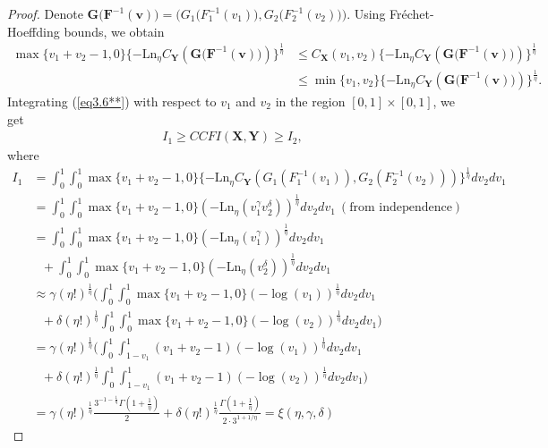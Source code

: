 \documentclass[12pt, a4paper]{article}
\numberwithin{equation}{section}
\begin{document}
\begin{proof}
Denote $\textbf{G}\big(\textbf{F}^{-1}(\textbf{v})\big)=\big(G_1\big(F_1^{-1}(v_1)\big),G_2\big(F_2^{-1}(v_2)\big)\big)$. Using Fr\'echet-Hoeffding bounds, we obtain 
\begin{align}\label{eq3.6**}
\max\{v_1+v_2-1,0\}\{-\mathrm{Ln}_\eta C_{\textbf{Y}}(\textbf{G}\big(\textbf{F}^{-1}(\textbf{v})\big))\}^{\frac{1}{\eta}}&\le C_{\textbf{X}}(v_1,v_2)\{-\mathrm{Ln}_\eta C_{\textbf{Y}}(\textbf{G}\big(\textbf{F}^{-1}(\textbf{v})\big))\}^{\frac{1}{\eta}}\nonumber\\
&\le \min\{v_1,v_2\}\{-\mathrm{Ln}_\eta C_{\textbf{Y}}(\textbf{G}\big(\textbf{F}^{-1}(\textbf{v})\big))\}^{\frac{1}{\eta}}.
\end{align}
 Integrating (\ref{eq3.6**}) with respect to $v_1$ and $v_2$ in the region $[0,1]\times[0,1]$, we get
\begin{eqnarray}\label{eq3.10}
I_1\ge CCFI(\textbf{X},\textbf{Y}) \ge I_2,
\end{eqnarray}
where 
\begin{align}
I_1&= \int_{0}^{1}\int_{0}^{1}\max\{v_1+v_2-1,0\}\{-\mathrm{Ln}_\eta C_{\textbf{Y}}(G_1(F_1^{-1}(v_1)),G_2(F_2^{-1}(v_2)))\}^{\frac{1}{\eta}}dv_2dv_1\nonumber\\
&=\int_{0}^{1}\int_{0}^{1}\max\{v_1+v_2-1,0\}\left(-\mathrm{Ln}_\eta(v_1^\gamma v_2^\delta)\right)^{\frac{1}{\eta}}dv_2dv_1 ~(\mbox{from~independence})\nonumber\\
&=\int_{0}^{1}\int_{0}^{1}\max\{v_1+v_2-1,0\}\left(-\mathrm{Ln}_\eta(v_1^\gamma)\right)^{\frac{1}{\eta}}dv_2dv_1\nonumber\\ &~~~+\int_{0}^{1}\int_{0}^{1}\max\{v_1+v_2-1,0\}\left(-\mathrm{Ln}_\eta( v_2^\delta)\right)^{\frac{1}{\eta}}dv_2dv_1\nonumber\\
&\approx \gamma (\eta!)^{\frac{1}{\eta}}\Big(\int_{0}^{1}\int_{0}^{1}\max\{v_1+v_2-1,0\}\left(-\log(v_1)\right)^{\frac{1}{\eta}}dv_2dv_1\nonumber\\ &~~~+ \delta (\eta!)^{\frac{1}{\eta}}\int_{0}^{1}\int_{0}^{1}\max\{v_1+v_2-1,0\}\left(-\log( v_2)\right)^{\frac{1}{\eta}}dv_2dv_1\Big)\nonumber\\
&= \gamma (\eta!)^{\frac{1}{\eta}}\Big(\int_{0}^{1}\int_{1-v_1}^{1}(v_1+v_2-1)\left(-\log(v_1)\right)^{\frac{1}{\eta}}dv_2dv_1\nonumber\\ &~~~+ \delta (\eta!)^{\frac{1}{\eta}}\int_{0}^{1}\int_{1-v_1}^{1}(v_1+v_2-1)\left(-\log( v_2)\right)^{\frac{1}{\eta}}dv_2dv_1\Big)\nonumber\\
&=\gamma (\eta!)^{\frac{1}{\eta}}\frac{3^{-1-\frac{1}{\eta}}\Gamma\left(1+\frac{1}{\eta}\right)}{2}+\delta(\eta!)^{\frac{1}{\eta}}\frac{\Gamma\left(1 + \frac{1}{\eta}\right)}{2 \cdot 3^{1 + 1/\eta}}=\xi(\eta,\gamma,\delta)

\end{align}
\end{proof}
\end{document}
